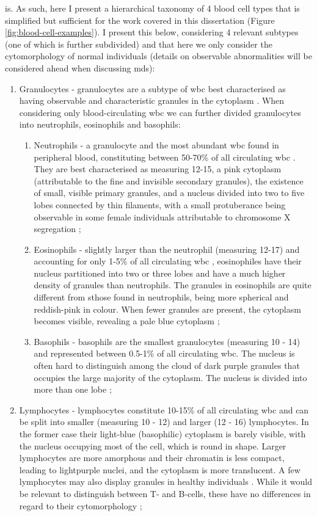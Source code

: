 is. As such, here I present a hierarchical taxonomy of 4 blood cell types that is simplified but sufficient for the work covered in this dissertation (Figure \ref{fig:blood-cell-examples}). I present this below, considering 4 relevant subtypes (one of which is further subdivided) and that here we only consider the cytomorphology of normal individuals (details on observable abnormalities will be considered ahead when discussing \ac{mds}):
\begin{enumerate}
    \item{Granulocytes} - granulocytes are a subtype of \ac{wbc} best characterised as having observable and characteristic granules in the cytoplasm \cite{Web2009-xt}. When considering only blood-circulating \ac{wbc} we can further divided granulocytes into neutrophils, eosinophils and basophils:
    \begin{enumerate}
        \item{Neutrophils} - a granulocyte and the most abundant \ac{wbc} found in peripheral blood, constituting between 50-70\% of all circulating \ac{wbc} \cite{Actor2012-wq}. They are best characterised as measuring 12-15\Mum, a pink cytoplasm (attributable to the fine and invisible secondary granules), the existence of small, visible primary granules, and a nucleus divided into two to five lobes connected by thin filaments, with a small protuberance being observable in some female individuals attributable to chromosome X segregation \cite{Bain2014-oc};
        \item{Eosinophils} - slightly larger than the neutrophil (measuring 12-17\Mum) and accounting for only 1-5\% of all circulating \ac{wbc} \cite{Simon2007-un}, eosinophiles have their nucleus partitioned into two or three lobes and have a much higher density of granules than neutrophils. The granules in eosinophils are quite different from sthose found in neutrophils, being more spherical and reddish-pink in colour. When fewer granules are present, the cytoplasm becomes visible, revealing a pale blue cytoplasm \cite{Bain2014-oc};
        \item{Basophils} - basophils are the smallest granulocytes (measuring 10 - 14\Mum) and represented between 0.5-1\% of all circulating \ac{wbc}. The nucleus is often hard to distinguish among the cloud of dark purple granules that occupies the large majority of the cytoplasm. The nucleus is divided into more than one lobe \cite{Bain2014-oc};
    \end{enumerate}
    \item{Lymphocytes} - lymphocytes constitute 10-15\% of all circulating \ac{wbc} and can be split into smaller (measuring 10 - 12\Mum) and larger (12 - 16\Mum) lymphocytes. In the former case their light-blue (basophilic) cytoplasm is barely visible, with the nucleus occupying most of the cell, which is round in shape. Larger lymphocytes are more amorphous and their chromatin is less compact, leading to lightpurple nuclei, and the cytoplasm is more translucent. A few lymphocytes may also display granules in healthy individuals \cite{Bain2014-oc}. While it would be relevant to distinguish between T- and B-cells, these have no differences in regard to their cytomorphology \cite{Cano2013-gu};

\end{enumerate}

